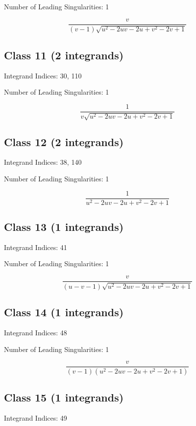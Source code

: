\documentclass[11pt,a4paper]{article}
\begin{document}
Number of Leading Singularities: 1

\begin{equation}
\frac{v}{(v-1) \sqrt{u^2-2 u v-2 u+v^2-2 v+1}}
\end{equation}


\subsection*{Class 11 (2 integrands)}
Integrand Indices: 30, 110

Number of Leading Singularities: 1

\begin{equation}
\frac{1}{v \sqrt{u^2-2 u v-2 u+v^2-2 v+1}}
\end{equation}


\subsection*{Class 12 (2 integrands)}
Integrand Indices: 38, 140

Number of Leading Singularities: 1

\begin{equation}
\frac{1}{u^2-2 u v-2 u+v^2-2 v+1}
\end{equation}


\subsection*{Class 13 (1 integrands)}
Integrand Indices: 41

Number of Leading Singularities: 1

\begin{equation}
\frac{v}{(u-v-1) \sqrt{u^2-2 u v-2 u+v^2-2 v+1}}
\end{equation}


\subsection*{Class 14 (1 integrands)}
Integrand Indices: 48

Number of Leading Singularities: 1

\begin{equation}
\frac{v}{(v-1) \left(u^2-2 u v-2 u+v^2-2 v+1\right)}
\end{equation}


\subsection*{Class 15 (1 integrands)}
Integrand Indices: 49
\end{document}
